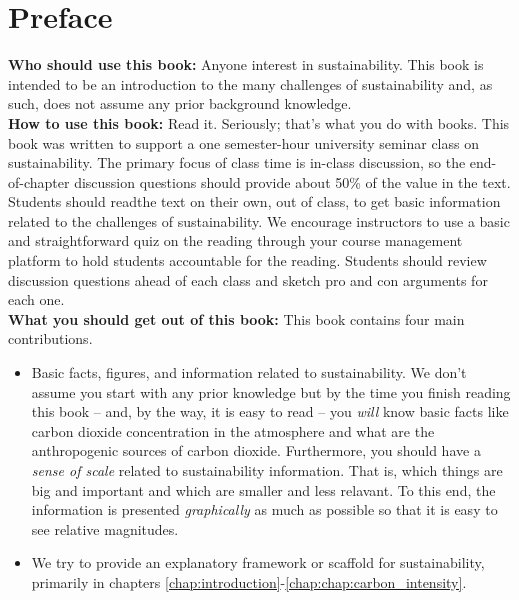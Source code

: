 \clearpage
 
 
 
 
\blankpage

{
\chapter*{Preface}
\thispagestyle{plain}

\noindent
\textbf{Who should use this book:} Anyone interest in sustainability. 
This book is intended to be an introduction to the many challenges of 
sustainability and, as such, does not assume any prior background knowledge. \\
\textbf{How to use this book:} Read it. Seriously; that's what you do with books.
This book was written to support a one semester-hour university seminar class
on sustainability. The primary focus of class time is in-class discussion, so 
the end-of-chapter discussion questions should provide about 50\% of the value
in the text. Students should readthe text on their own, out of class, to get 
basic information related to  the challenges of sustainability. We encourage 
instructors to use a basic and straightforward quiz on the reading through your 
course management platform to hold students accountable for the reading. 
Students should review discussion questions ahead of each class and sketch 
pro and con arguments for each one. \\
\textbf{What you should get out of this book:} This book contains four main 
contributions.
\begin{itemize}
\item Basic facts, figures, and information related to sustainability. We don't 
assume you start with any prior knowledge but by the time you finish reading this
book -- and, by the way, it is easy to read -- you \emph{will} know basic facts
like carbon dioxide concentration in the atmosphere and what are the anthropogenic
sources of carbon dioxide. Furthermore, you should have a \emph{sense of scale}
related to sustainability information. That is, which things are big and 
important and which are smaller and less relavant. To this end, the information
is presented \emph{graphically} as much as possible so that it is easy to see
relative magnitudes.
\item We try to provide an explanatory framework or scaffold for sustainability,
primarily in chapters \ref{chap:introduction}-\ref{chap:chap:carbon_intensity}.

\end{itemize}}
